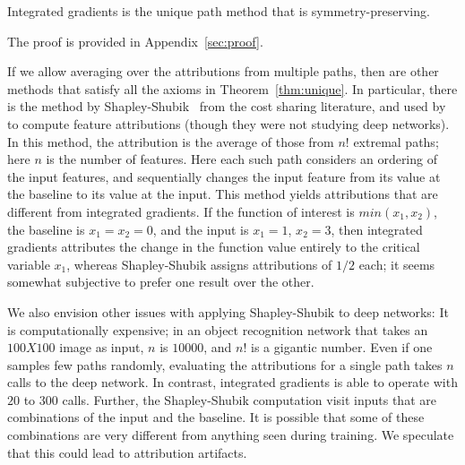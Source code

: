 \begin{theorem}\label{thm:unique}
Integrated gradients is the unique path method that is symmetry-preserving.
\end{theorem}
The proof is provided in Appendix~\ref{sec:proof}.
\begin{remark}
If we allow averaging over the attributions from multiple paths, then
are other methods that satisfy all the axioms in
Theorem~\ref{thm:unique}.
In particular, there is the method by Shapley-Shubik~\cite{ShaShu71}
from the cost sharing literature, and used by~\cite{LundbergL16, DSZ16}
to compute feature attributions (though they were not studying deep networks).
In this method, the attribution is the average of those from $n!$ extremal paths; here $n$
is the number of features. Here each such path considers an ordering
of the input features, and sequentially changes the input feature from
its value at the baseline to its value at the input.
This method yields attributions that are different from integrated gradients. If the function of interest is $min(x_1,x_2)$, the baseline is $x_1=x_2=0$, and the input is $x_1 = 1$, $x_2 =3$,
then integrated gradients attributes the change in the function value entirely to the critical variable $x_1$, whereas Shapley-Shubik assigns attributions of $1/2$ each; it seems somewhat subjective to prefer one result over the other.

We also envision other issues with applying Shapley-Shubik to deep networks:
It is computationally expensive; in an object recognition
network that takes an $100X100$ image as input, $n$ is $10000$, and
$n!$ is a gigantic number.  Even if one samples few paths randomly,
evaluating the attributions for a single path takes $n$ calls to the
deep network. In contrast, integrated gradients is able to operate
with $20$ to $300$ calls. Further, the Shapley-Shubik computation
visit inputs that are combinations of the input and the baseline. It
is possible that some of these combinations are very different from
anything seen during training. We speculate that this could lead to
attribution artifacts.
\end{remark}

